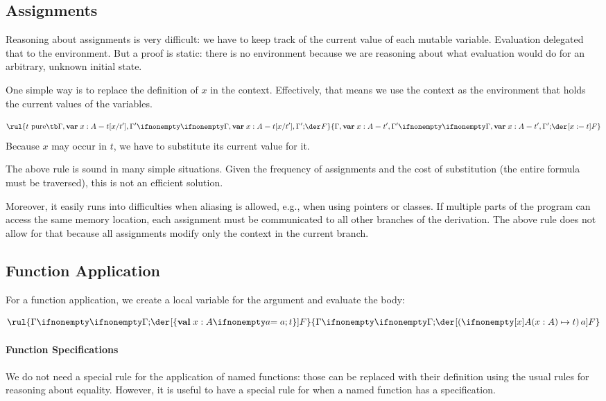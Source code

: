 \subsection{Assignments}

Reasoning about assignments is very difficult: we have to keep track of the current value of each mutable variable.
Evaluation delegated that to the environment.
But a proof is static: there is no environment because we are reasoning about what evaluation would do for an arbitrary, unknown initial state.

One simple way is to replace the definition of $x$ in the context.
Effectively, that means we use the context as the environment that holds the current values of the variables.

\[\rul{t \text{ pure} \tb \iscons{}{\Gamma,\amval{x}{A}{t[x/t']},\Gamma'}{}{F}}
      {\iscons{}{\Gamma,\amval{x}{A}{t'},\Gamma'}{}{\abox{x:=t}{F}}}\]
Because $x$ may occur in $t$, we have to substitute its current value for it.

The above rule is sound in many simple situations.
Given the frequency of assignments and the cost of substitution (the entire formula must be traversed), this is not an efficient solution.

Moreover, it easily runs into difficulties when aliasing is allowed, e.g., when using pointers or classes.
If multiple parts of the program can access the same memory location, each assignment must be communicated to all other branches of the derivation.
The above rule does not allow for that because all assignments modify only the context in the current branch.

\subsection{Function Application}

For a function application, we create a local variable for the argument and evaluate the body:

\[\rul{\iscons{}{\Gamma}{}{\abox{\{\aval{x}{A}{a};t\}}{F}}}
      {\iscons{}{\Gamma}{}{\abox{(\alam[A]{x}{t})\,a}{F}}}
\]

\paragraph{Function Specifications}
We do not need a special rule for the application of named functions: those can be replaced with their definition using the usual rules for reasoning about equality.
However, it is useful to have a special rule for when a named function has a specification.

